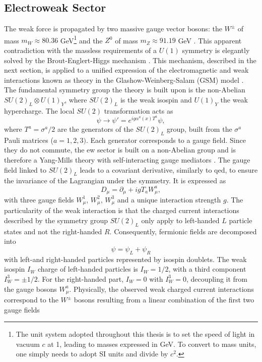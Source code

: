 \subsection{Electroweak Sector}
The weak force is propagated by two massive gauge vector bosons: the $W^{\pm}$ of mass $m_W \approx 80.36$ GeV\footnote{The unit system adopted throughout this thesis is to set the speed of light in vacuum $c$ at 1, leading to masses expressed in GeV. To convert to mass units, one simply needs to adopt SI units and divide by $c^2$.} and the $Z^0$ of mass $m_Z \approx 91.19$ GeV \cite{Tanabashi:2018oca}. This apparent contradiction with the massless requirements of a $U(1)$ symmetry is elegantly solved by the Brout-Englert-Higgs mechanism \cite{Englert:1964et,  PhysRevLett.13.508}. This mechanism, described in the next section, is applied to a unified expression of the electromagnetic and weak interactions known as  theory in the Glashow-Weinberg-Salam (GSM) model \cite{GLASHOW1961579, PhysRevLett.19.1264, Salam:1968rm}. The fundamental symmetry group the theory is built upon is the non-Abelian $SU(2)_L \otimes U(1)_Y$, where $SU(2)_L$ is the weak isospin and $U(1)_Y$ the weak hypercharge. The local $SU(2)$ transformation acts as
\begin{equation}\label{eq-GaugeSU2}
    \psi \rightarrow \psi' = e^{i g \alpha^a(x) T^a } \psi,
\end{equation}
where $T^a = \sigma^a / 2$ are the generators of the $SU(2)_L$ group, built from the $\sigma^a$ Pauli matrices ($a = 1, 2, 3)$.  Each generator corresponds to a gauge field. Since they do not commute, the \gls{ew} sector is built on a non-Abelian group and is therefore a Yang-Mills theory with self-interacting gauge mediators \cite{PhysRev.96.191}. The gauge field linked to $SU(2)_L$ leads to a covariant derivative, similarly to \gls{qed}, to ensure the invariance of the Lagrangian under the symmetry. It is expressed as
\begin{equation}\label{eq-CovDerSU2}
   D_{\mu}  = \partial_{\mu} + igT_a W_{\mu}^a,
\end{equation}
with three gauge fields $W_{\mu}^1$, $W_{\mu}^2$, $W_{\mu}^3$ and a unique interaction strength $g$. The particularity of the weak interaction is that the charged current interactions described by the symmetry group $SU(2)_L$ only apply to left-handed $L$ particle states and not the right-handed $R$. Consequently, fermionic fields are decomposed into \[\psi = \psi_L + \psi_R\] with left-and right-handed particles represented by isospin doublets. The weak isospin $I_W$ charge of left-handed particles is $I_W = 1/2$, with a third component $I_W^3 = \pm  1/2$. For the right-handed part, $I_W = 0$ with $I_W^3 = 0$, decoupling it from the gauge bosons $W_{\mu}^a$. Physically, the observed weak charged current interactions correspond to the $W^{\pm}$ bosons resulting from a linear combination of the first two gauge fields
